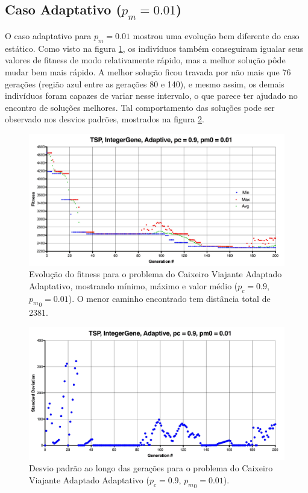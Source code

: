 \subsection{Caso Adaptativo ($p_m = 0.01$)}

O caso adaptativo para $p_m = 0.01$ mostrou uma evolução bem diferente do caso estático. Como visto na figura \ref{fig:tsp_001_adaptative}, os indivíduos também conseguiram igualar seus valores de fitness de modo relativamente rápido, mas a melhor solução pôde mudar bem mais rápido. A melhor solução ficou travada por não mais que 76 gerações (região azul entre as gerações 80 e 140), e mesmo assim, os demais indivíduos foram capazes de variar nesse intervalo, o que parece ter ajudado no encontro de soluções melhores. Tal comportamento das soluções pode ser observado nos desvios padrões, mostrados na figura \ref{fig:tsp_001_adaptive_std}.

\begin{figure}[ht!]
    \centering \includegraphics[width=1.0\textwidth]{tsp_001_adaptive.jpg}
    \caption{Evolução do fitness para o problema do Caixeiro Viajante Adaptado Adaptativo, mostrando mínimo, máximo e valor médio ($p_c=0.9$, ${p_m}_0=0.01$). O menor caminho encontrado tem distância total de 2381.}
    \label{fig:tsp_001_adaptative}
\end{figure}

\begin{figure}[ht!]
    \centering \includegraphics[width=1.0\textwidth]{tsp_001_adaptive_std.jpg}
    \caption{Desvio padrão ao longo das gerações para o problema do Caixeiro Viajante Adaptado Adaptativo ($p_c=0.9$, ${p_m}_0=0.01$).}
    \label{fig:tsp_001_adaptive_std}
\end{figure}

